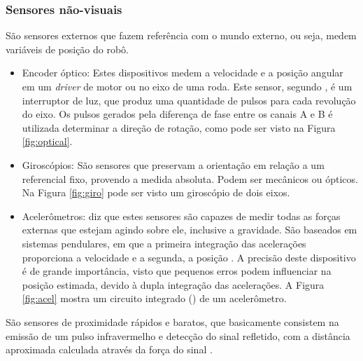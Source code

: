 \subsubsection{Sensores não-visuais}


 São sensores externos que fazem referência com o mundo externo, ou seja, medem variáveis de 
posição do robô.
  \begin{itemize}
   \item Encoder óptico: Estes dispositivos medem a velocidade e a posição angular em um \textit{driver} de motor ou no eixo de uma 
   roda. Este sensor, segundo , é um interruptor de luz, que produz uma quantidade de pulsos para cada revolução 
   do eixo. Os pulsos gerados pela diferença de fase entre os canais A e B é utilizada determinar a direção de rotação, como pode 
   ser visto na Figura \ref{fig:optical}.
   
   \item Giroscópios: São sensores que preservam a orientação em relação a um referencial fixo, provendo a medida absoluta. Podem ser 
   mecânicos ou ópticos. Na Figura \ref{fig:giro} pode ser visto um giroscópio de dois eixos.
   
   \item Acelerômetros:  diz que estes sensores são capazes de medir todas as forças externas que estejam 
   agindo sobre ele, inclusive a gravidade. 
   São baseados em sistemas pendulares, em que a primeira integração das acelerações proporciona a velocidade e a 
   segunda, a posição \cite{secchi2012}. A precisão deste dispositivo é de grande importância, visto que pequenos erros podem 
   influenciar na posição estimada, devido à dupla integração das acelerações. A Figura \ref{fig:acel}
   mostra um circuito integrado () de um acelerômetro.
  \end{itemize}
  
 São sensores de proximidade rápidos e baratos, que basicamente consistem na emissão de 
 um pulso infravermelho e detecção do sinal refletido, com a distância aproximada calculada através da 
 força do sinal \cite{dudek_mobile}.
 
